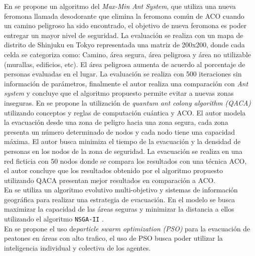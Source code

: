En \cite{ohta2016improved} se propone un algoritmo del \textit{Max-Min Ant System}, que utiliza una nueva feromona llamada desodorante que elimina la feromona común de ACO cuando un camino peligroso ha sido encontrado, el objetivo de nueva feromona es poder entregar un mayor nivel de seguridad. La evaluación se realiza con un mapa de distrito de Shinjuku en Tokyo representada una matriz de 200x200, donde cada celda se categoriza como: Camino, área segura, área peligrosa y área no utilizable (murallas, edificios, etc). El área peligrosa aumenta de acuerdo al porcentaje de personas evaluadas en el lugar. La evaluación se realiza con 500 iteraciones sin información de parámetros, finalmente el autor realiza una comparación con \textit{Ant system} y concluye que el algoritmo propuesto permite evitar a nuevas zonas inseguras.
En \cite{liu2016evacuation} se propone la utilización de \textit{quantum ant colony algorithm (QACA)} utilizando conceptos y reglas de computación cuántica y ACO. El autor modela la evacuación desde una zona de peligro hacia una zona segura, cada zona presenta un número determinado de nodos y cada nodo tiene una capacidad máxima. El autor busca minimiza el tiempo de la evacuación y la densidad de personas en los nodos de la zona de seguridad. La evacuación se realiza en una red ficticia con 50 nodos donde se compara los resultados con una técnica ACO, el autor concluye que los resultados obtenido por el algoritmo propuesto utilizando QACA presentan mejor resultados en comparación a ACO.\\
En \cite{saadatseresht2009evacuation} se utiliza un algoritmo evolutivo multi-objetivo y sistemas de información geográfica para realizar una estrategia de evacuación. En el modelo se busca maximizar la capacidad de las áreas seguras y minimizar la distancia a ellos utilizando el algoritmo \texttt{NSGA-II} \cite{deb2002fast}. \\
En \cite{izquierdo2009forecasting,zheng2012modeling} se propone el uso de\textit{particle swarm optimization (PSO)} para la evacuación de peatones en áreas con alto trafico, el uso de PSO busca poder utilizar la inteligencia individual y colectiva de los agentes.
